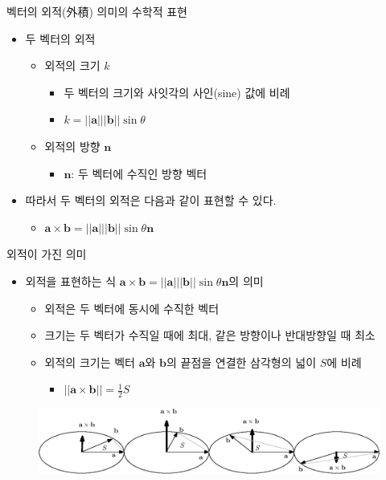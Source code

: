 \documentclass{beamer}
\begin{document}
\begin{frame}{벡터의 외적(外積) 의미의 수학적 표현}

\begin{itemize}
\item 두 벡터의 외적
	\begin{itemize}
	\item 외적의 크기 $k$
		\begin{itemize}
		\item 두 벡터의 크기와 사잇각의 사인(sine) 값에 비례
		\item $k = ||\mathbf a|| |\mathbf b|| \sin \theta$
		\end{itemize}
	\item 외적의 방향 $\mathbf n$
		\begin{itemize}
		\item $\mathbf n$: 두 벡터에 수직인 방향 벡터
		\end{itemize}
	\end{itemize}
\item 따라서 두 벡터의 외적은 다음과 같이 표현할 수 있다.
	\begin{itemize}
	\item $\mathbf a \times \mathbf b = ||\mathbf a|| |\mathbf b|| \sin \theta \mathbf n$
	\end{itemize}
\end{itemize}


\end{frame}

\begin{frame}{외적이 가진 의미}

\begin{itemize}
\item 외적을 표현하는 식 $\mathbf a \times \mathbf b = ||\mathbf a|| |\mathbf b|| \sin \theta \mathbf n$의 의미
	\begin{itemize}
	\item 외적은 두 벡터에 동시에 수직한 벡터
	\item 크기는 두 벡터가 수직일 때에 최대, 같은 방향이나 반대방향일 때 최소
	\item 외적의 크기는 벡터 $\mathbf a$와 $\mathbf b$의 끝점을 연결한 삼각형의 넓이 $S$에 비례
		\begin{itemize}
		\item $|| \mathbf a \times \mathbf b || = \frac{1}{2} S $
		\end{itemize}
		\end{itemize}
\end{itemize}


\begin{figure}
\includegraphics[width=12cm]{Math_vector/crossProductDirSize.eps}
\end{figure}

\end{frame}
\end{document}
